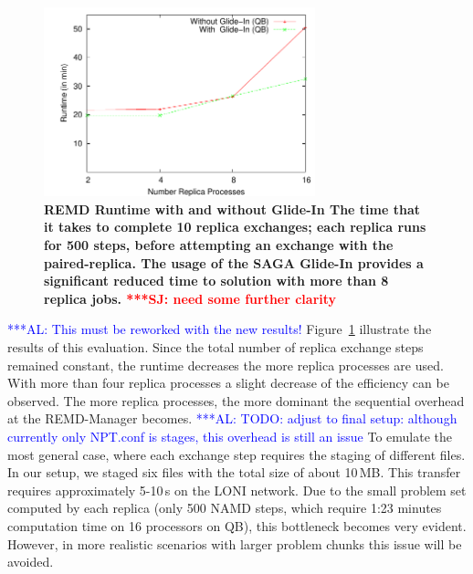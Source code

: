 \documentclass{rspublic}
\newcommand{\alnote}[1]{ {\textcolor{blue} { ***AL: #1 }}}
\newcommand{\jhanote}[1]{ {\textcolor{red} { ***SJ: #1 }}}
\newcommand{\alnote}[1]{}
\newcommand{\jhanote}[1]{}
\newcommand{\glidein}[1]{Glide-In }
\begin{document}
\begin{figure}[ht]
    \centering
    \hspace*{-20pt}
        \includegraphics[width=0.7\textwidth]{performance/perf_remd_glidin.pdf}
        \caption{\footnotesize \bf REMD Runtime with and without \glidein: 
         The time that it takes to complete 10 replica exchanges; 
each replica runs for 500 steps, before attempting an exchange with
the paired-replica. The usage of the SAGA Glide-In provides a significant reduced time to solution with more than 8 replica jobs. 
          \jhanote{need some further clarity} 
     }
    \label{fig:performance_perf_runtime}
\end{figure}     

\alnote{This must be reworked with the new results!}
Figure~\ref{fig:performance_perf_runtime} illustrate the results of
this evaluation. Since the total number of replica exchange steps
remained constant, the runtime decreases the more replica processes
are used.  With more than four replica processes a slight decrease of
the efficiency can be observed.
The more replica processes, the more dominant the sequential overhead
at the REMD-Manager becomes. 
\alnote{TODO: adjust to final setup: although currently only NPT.conf is
stages, this overhead is still an issue}
To emulate the most general case, where each exchange step requires the staging of
different files. In our setup, we staged six files with the total size
of about 10\,MB. This transfer requires approximately 5-10\,s
on the LONI network.  Due to the small problem set computed by each
replica (only 500 NAMD steps, which require 1:23 minutes computation
time on 16 processors on QB), this bottleneck becomes very evident. However, in more
realistic scenarios with larger problem chunks this issue will be
avoided.
\end{document}
